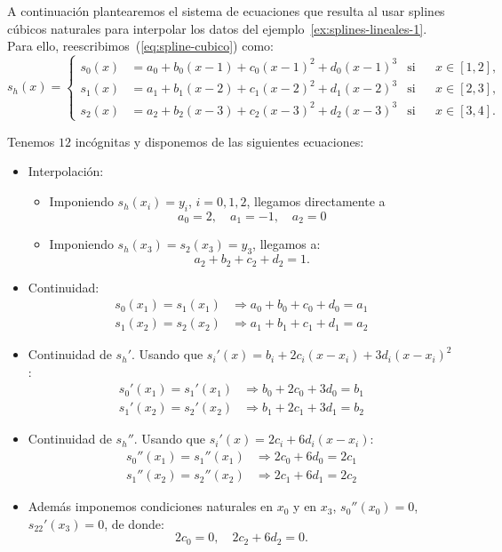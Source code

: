 \begin{example}
  \label{ex:splines-cubicos}
  A continuación plantearemos el sistema de ecuaciones que resulta al
  usar splines cúbicos naturales para
  interpolar los datos del ejemplo~\ref{ex:splines-lineales-1}. Para
  ello, reescribimos~(\ref{eq:spline-cubico}) como:
  \begin{equation*}
    s_h(x)=\left\{
      \begin{aligned}
        s_0(x)&=a_0 + b_0(x-1) + c_0(x-1)^2 + d_0(x-1)^3 
        & \text{si} && x\in[1,2],
        \\
        s_1(x)&=a_1 + b_1(x-2) + c_1(x-2)^2 + d_1(x-2)^3 
        &\text{si}&& x\in[2,3],
        \\
        s_2(x)&=a_2 + b_2(x-3) + c_2(x-3)^2 + d_2(x-3)^3 
        & \text{si}&& x\in[3,4].
      \end{aligned}\right.
  \end{equation*}
\end{example}

Tenemos $12$ incógnitas y disponemos de las siguientes ecuaciones:
\begin{itemize}
\item Interpolación:
  \begin{itemize}
  \item Imponiendo $s_h(x_i)=y_i$, $i=0,1,2$, llegamos directamente
    a
    \begin{equation*}
      a_0=2, \quad a_1=-1, \quad a_2=0
    \end{equation*}
  \item Imponiendo $s_h(x_3)=s_2(x_3)=y_3$, llegamos a:
    \begin{equation*}
      a_2+b_2+c_2+d_2=1.
    \end{equation*}
  \end{itemize}
\item Continuidad:
  \begin{align*}
   s_0(x_1)=s_1(x_1) &\Rightarrow a_0+b_0+c_0+d_0 = a_1
   \\
   s_1(x_2)=s_2(x_2) &\Rightarrow a_1+b_1+c_1+d_1 = a_2
  \end{align*}
\item Continuidad de $s_h'$. Usando que
  $s_i'(x)=b_i+2c_i(x-x_i)+3d_i(x-x_i)^2$:
  \begin{align*}
   s_0'(x_1)=s_1'(x_1) &\Rightarrow b_0+2c_0+3d_0 = b_1
   \\
   s_1'(x_2)=s_2'(x_2) &\Rightarrow b_1+2c_1+3d_1 = b_2
  \end{align*}
\item Continuidad de $s_h''$. Usando que
  $s_i'(x)=2c_i+6d_i(x-x_i)$:
  \begin{align*}
   s_0''(x_1)=s_1''(x_1) &\Rightarrow 2c_0+6d_0 = 2c_1
   \\
   s_1''(x_2)=s_2''(x_2) &\Rightarrow 2c_1+6d_1 = 2c_2
  \end{align*}
\item Además imponemos condiciones naturales en $x_0$ y en $x_3$,
  $s_0''(x_0)=0$, $s_22'(x_3)=0$, de donde:
  \begin{equation*}
   2c_0 = 0, \quad 2c_2 + 6 d_2 =0.
  \end{equation*}
\end{itemize}

